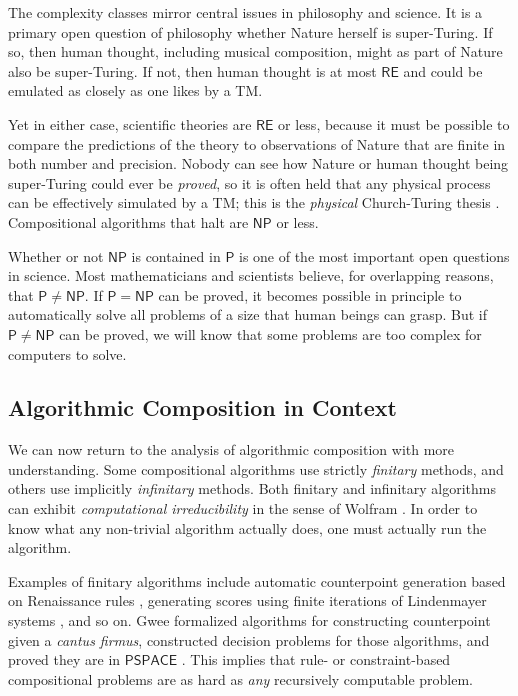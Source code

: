 \documentclass[]{interact}
\theoremstyle{plain}%
\theoremstyle{definition}
\theoremstyle{remark}
\begin{document}
\noindent The complexity classes mirror central issues in philosophy and science. It is a primary open question of philosophy whether Nature herself is super-Turing. If so, then human thought, including musical composition, might as part of Nature also be super-Turing. If not, then human thought is at most $\mathsf{RE}$ and could be emulated as closely as one likes by a TM. 

Yet in either case, scientific theories are $\mathsf{RE}$ or less, because it must be possible to compare the predictions of the theory to observations of Nature that are finite in both number and precision. Nobody can see how Nature or human thought being super-Turing could ever be \emph{proved}, so it is often held that any physical process can be effectively simulated by a TM; this is the \emph{physical} Church-Turing thesis \citep{aaronson2005npcomplete, sep-church-turing}. Compositional algorithms that halt are $\mathsf{NP}$ or less.

Whether or not $\mathsf{NP}$ is contained in $\mathsf{P}$ is one of the most important open questions in science. Most mathematicians and scientists believe, for overlapping reasons, that $\mathsf{P} \neq \mathsf{NP}$. If $\mathsf{P} = \mathsf{NP}$  can be proved, it becomes possible in principle to automatically solve all problems of a size that human beings can grasp. But if $\mathsf{P} \ne \mathsf{NP}$ can be proved, we will know that some problems are too complex for computers to solve.
 
\subsection{Algorithmic Composition in Context}

We can now return to the analysis of algorithmic composition with more understanding. Some compositional algorithms use strictly \emph{finitary} methods, and others use implicitly \emph{infinitary} methods. Both finitary and infinitary algorithms can exhibit \emph{computational irreducibility} in the sense of Wolfram \citep{wolfram1985undecidability}. In order to know what any non-trivial algorithm actually does, one must actually run the algorithm.

Examples of finitary algorithms include automatic counterpoint generation based on Renaissance rules \citep{schottstaedt1989automatic, taube1991common}, generating scores using finite iterations of Lindenmayer systems \citep{mccormack1991lsystems}, and so on. Gwee formalized algorithms for constructing counterpoint given a \emph{cantus firmus}, constructed decision problems for those algorithms, and proved they are in $\mathsf{PSPACE}$ \citep{gwee2002complexity, gwee2013music}. This implies that rule- or constraint-based compositional problems are as hard as \emph{any} recursively computable problem.
\end{document}

